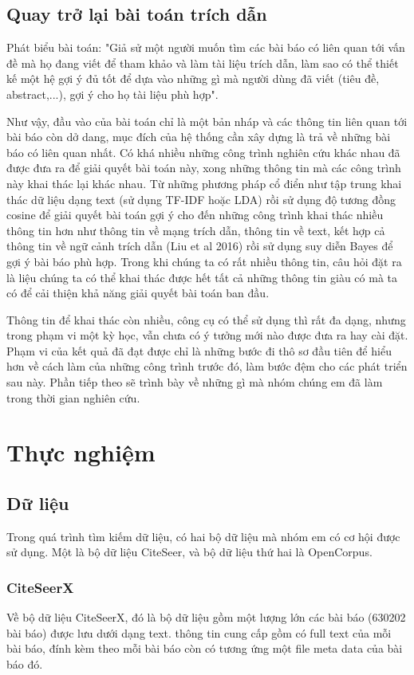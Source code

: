\documentclass[12pt,a4paper]{article}
\begin{document}
\newpage

\subsection{Quay trở lại bài toán trích dẫn}
Phát biểu bài toán: "Giả sử một người muốn tìm các bài báo có liên quan tới vấn đề mà họ đang viết để tham khảo và làm tài liệu trích dẫn, làm sao có thể thiết kế một hệ gợi ý đủ tốt để dựa vào những gì mà người dùng đã viết (tiêu đề, abstract,...), gợi ý cho họ tài liệu phù hợp".


Như vậy, đầu vào của bài toán chỉ là một bản nháp và các thông tin liên quan tới bài báo còn dở dang, mục đích của hệ thống cần xây dựng là trả về những bài báo có liên quan nhất. Có khá nhiều những công trình nghiên cứu khác nhau đã được đưa ra để giải quyết bài toán này, xong những thông tin mà các công trình này khai thác lại khác nhau. Từ những phương pháp cổ điển như tập trung khai thác dữ liệu dạng text (sử dụng TF-IDF hoặc LDA) rồi sử dụng độ tương đồng cosine để giải quyết bài toán gợi ý cho đến những công trình khai thác nhiều thông tin hơn như thông tin về mạng trích dẫn, thông tin về text, kết hợp cả thông tin về ngữ cảnh trích dẫn (Liu et al 2016) rồi sử dụng suy diễn Bayes để gợi ý bài báo phù hợp.  Trong khi chúng ta có rất nhiều thông tin, câu hỏi đặt ra là liệu chúng ta có thể khai thác được hết tất cả những thông tin giàu có mà ta có để cải thiện khả năng giải quyết bài toán ban đầu.


Thông tin để khai thác còn nhiều, công cụ có thể sử dụng thì rất đa dạng, nhưng trong phạm vi một kỳ học, vẫn chưa có ý tưởng mới nào được đưa ra hay cài đặt. Phạm vi của kết quả đã đạt được chỉ là những bước đi thô sơ đầu tiên để hiểu hơn về cách làm của những công trình trước đó, làm bước đệm cho các phát triển sau này. Phần tiếp theo sẽ trình bày về những gì mà nhóm chúng em đã làm trong thời gian nghiên cứu.

\newpage
\section{Thực nghiệm}
\subsection{Dữ liệu}
Trong quá trình tìm kiếm dữ liệu, có hai bộ dữ liệu mà nhóm em có cơ hội được sử dụng. Một là bộ dữ liệu CiteSeer, và bộ dữ liệu thứ hai là OpenCorpus.

\subsubsection{CiteSeerX}
Về bộ dữ liệu CiteSeerX, đó là bộ dữ liệu gồm một lượng lớn các bài báo (630202 bài báo) được lưu dưới dạng text. thông tin cung cấp gồm có full text của mỗi bài báo, đính kèm theo mỗi bài báo còn có tương ứng một file meta data của bài báo đó. 
\end{document}
